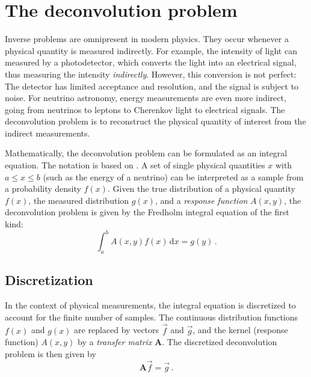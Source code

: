\section{The deconvolution problem} %
Inverse problems are omnipresent in modern physics.
They occur whenever a physical quantity is measured indirectly.
For example,
the intensity of light can measured by a photodetector,
  which converts the light into an electrical signal,
    thus measuring the intensity \emph{indirectly}.
However,
this conversion is not perfect:
The detector has limited acceptance and resolution,
and the signal is subject to noise.
For neutrino astronomy,
  energy measurements are even more indirect,
    going from neutrinos to leptons to Cherenkov light to electrical signals.
%
The deconvolution problem is to reconstruct the physical quantity of interest
  from the indirect measurements.

Mathematically,
the deconvolution problem can be formulated as an integral equation.
%
The notation is based on \citeauthor{blobel_deconvolution} \cite{blobel_deconvolution}.
A set of single physical quantities $x$
  with $a \leq x \leq b$ %
  (such as the energy of a neutrino)
can be interpreted as a sample from a probability density $f(x)$.
%
Given
  the true distribution of a physical quantity $f(x)$,
  the measured distribution $g(x)$,
  and a \emph{response function} $A(x, y)$,
the deconvolution problem is given by
the Fredholm integral equation of the first kind: \cite{blobel_deconvolution}
\begin{equation}
  \label{eq:deconvolution_problem:fredholm}
  \int_a^b A(x, y) f(x) \, \mathrm{d}x = g(y) \, .
\end{equation}


\subsection{Discretization}
In the context of physical measurements,
the integral equation is discretized
  to account for the finite number of samples.
The continuous distribution functions $f(x)$ and $g(x)$ are replaced by vectors $\vec{f}$ and $\vec{g}$,
and the kernel (response function) $A(x, y)$ by a \emph{transfer matrix} $\symbf{A}$.
%
The discretized deconvolution problem is then given by
\begin{equation}
  \label{eq:deconvolution_problem:discretized}
  \symbf{A} \vec{f} = \vec{g} \, .
\end{equation}

